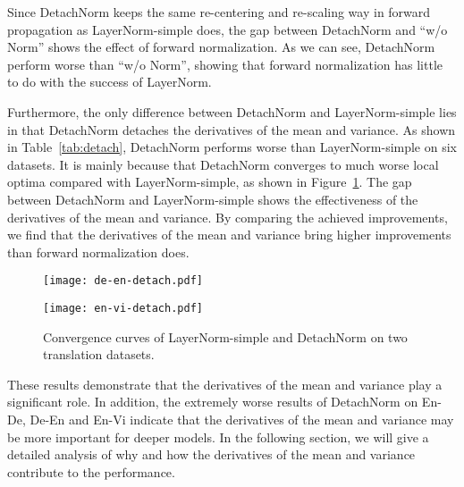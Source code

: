 \documentclass{article}
\begin{document}
Since DetachNorm keeps the same re-centering  and re-scaling way in forward propagation as LayerNorm-simple does, the gap between DetachNorm and  ``w/o Norm''  shows the effect of forward normalization. As we can see, DetachNorm perform worse than ``w/o Norm'', showing that forward normalization has little to do with the success of LayerNorm. 

Furthermore, the only difference between DetachNorm and LayerNorm-simple lies in that DetachNorm detaches the derivatives of the mean and variance. As shown in Table~\ref{tab:detach}, DetachNorm performs worse than LayerNorm-simple on six datasets. It is mainly because that DetachNorm converges to  much worse local optima compared with LayerNorm-simple, as shown in Figure~\ref{fig:detach}. The gap between DetachNorm and LayerNorm-simple shows the effectiveness of the derivatives of the mean and variance.  By comparing the achieved improvements, we find that the derivatives of the mean and variance bring higher improvements than forward normalization does.


\begin{figure}[t]
\centering
\small
\begin{minipage}{.4\textwidth}
  \centering
  \texttt{[image: de-en-detach.pdf]}

  
\end{minipage}\begin{minipage}{.4\textwidth}
  \centering
  \texttt{[image: en-vi-detach.pdf]}
\end{minipage}

\caption{Convergence curves of LayerNorm-simple and DetachNorm on two translation datasets. }


 \label{fig:detach}
\end{figure}
These results demonstrate that the derivatives of the mean and variance play a significant role. In addition, the extremely worse results of DetachNorm on En-De, De-En and En-Vi indicate that the derivatives of the mean and variance may be more important for deeper models. In the following section, we will give a detailed analysis of why and how the derivatives of the mean and variance contribute to the performance. 
\end{document}
